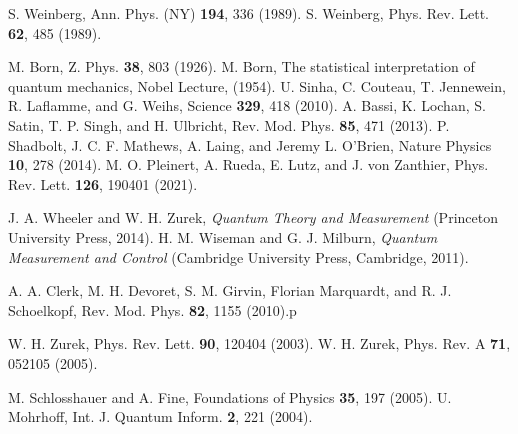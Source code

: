 \documentclass[twocolumn,showpacs,preprintnumbers,amsmath,amssymb]{revtex4}
\begin{document}
	\begin{thebibliography}{99}
		
		 S. Weinberg,
		Ann. Phys. (NY) \textbf{194}, 336 (1989).
		S. Weinberg,
		Phys. Rev. Lett. \textbf{62}, 485 (1989).
		
		
		M. Born,
		Z. Phys. \textbf{38}, 803 (1926).
		M. Born, The statistical interpretation of quantum mechanics, Nobel Lecture, (1954).
		U. Sinha, C. Couteau, T. Jennewein, R. Laflamme, and G. Weihs, %
		Science \textbf{329}, 418 (2010).
		A. Bassi, K. Lochan, S. Satin, T. P. Singh, and H. Ulbricht,
		Rev. Mod. Phys. \textbf{85}, 471 (2013).
		P. Shadbolt, J. C. F. Mathews, A. Laing, and Jeremy L. O'Brien,
		Nature Physics \textbf{10}, 278 (2014).
		M. O. Pleinert, A. Rueda, E. Lutz, and J. von Zanthier,
		Phys. Rev. Lett. \textbf{126}, 190401  (2021).
		
		
		J. A. Wheeler and W. H. Zurek,  \emph{Quantum Theory and Measurement}
		(Princeton University Press, 2014).
		H. M. Wiseman and G. J. Milburn,
		\emph{Quantum Measurement and Control}
		(Cambridge University Press, Cambridge, 2011).

        A. A. Clerk, M. H. Devoret, S. M. Girvin, Florian Marquardt, and R. J. Schoelkopf, Rev. Mod. Phys. \textbf{82}, 1155 (2010).p		

		W. H. Zurek,
		Phys. Rev. Lett. \textbf{90}, 120404  (2003).
		W. H. Zurek,
		Phys. Rev. A \textbf{71}, 052105 (2005).
		
		M. Schlosshauer and A. Fine,
		Foundations of Physics  \textbf{35}, 197 (2005).
		U. Mohrhoff,
		Int. J. Quantum Inform. \textbf{2}, 221 (2004).
		

\end{thebibliography}
\end{document}
